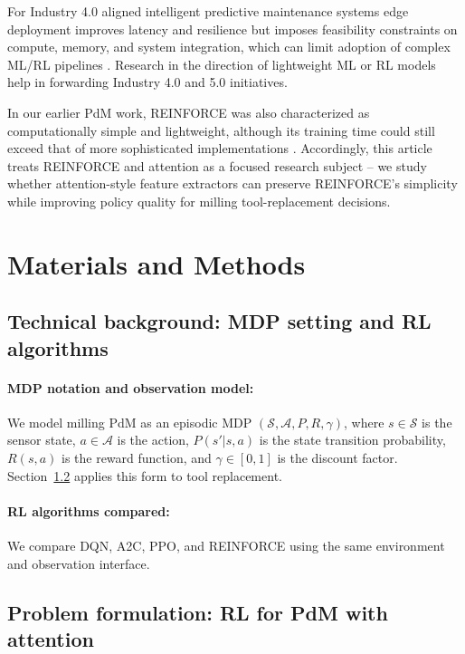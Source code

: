 \documentclass[sn-basic]{sn-jnl}%
\begin{document}
For Industry 4.0 aligned intelligent predictive maintenance systems edge deployment improves latency and resilience but imposes feasibility constraints on compute, memory, and system integration, which can limit adoption of complex ML/RL pipelines \cite{Njor2024, Pandey2023}. Research in the direction of lightweight ML or RL models help in forwarding Industry 4.0 and 5.0 initiatives.

In our earlier PdM work, \textsc{REINFORCE} was also characterized as computationally simple and lightweight, although its training time could still exceed that of more sophisticated implementations \cite{Siraskar2025}. Accordingly, this article treats \textsc{REINFORCE} and attention as a focused research subject -- we study whether attention-style feature extractors can preserve REINFORCE's simplicity while improving policy quality for milling tool-replacement decisions.

\section{Materials and Methods}\label{sec:method}

\subsection{Technical background: MDP setting and RL algorithms}\label{sec:tech_background}
\paragraph{MDP notation and observation model:}
We model milling PdM as an episodic MDP $(\mathcal{S},\mathcal{A},P,R,\gamma)$, where $s \in \mathcal{S}$ is the sensor state, $a \in \mathcal{A}$ is the action, $P(s'|s,a)$ is the state transition probability, $R(s,a)$ is the reward function, and $\gamma \in [0,1]$ is the discount factor. Section~\ref{sec:env} applies this form to tool replacement.

\paragraph{RL algorithms compared:}
We compare DQN, A2C, PPO, and \textsc{REINFORCE} using the same environment and observation interface.

\subsection{Problem formulation: RL for PdM with attention} \label{sec:env} \label{app:env_reward}
\end{document}

